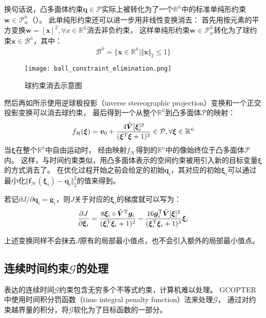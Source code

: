 换句话说，凸多面体约束$\bm{q} \in \mathcal{P}$实际上被转化为了一个$\mathbb{R}^{\hat{n}}$中的标准单纯形约束$\bm{w} \in \mathcal{P}_w^{\hat{n}}$（）。
此单纯形约束还可以进一步用非线性变换消去：
首先用按元素的平方变换$\bm{w}=[\bm{x}]^2,\forall x\in\mathbb{R}^{\hat{n}}$消去非负约束，
这样单纯形约束$\bm{w} \in \mathcal{P}_w^{\hat{n}}$转化为了球约束$\bm{x}\in\mathcal{B}^{\hat{n}}$，其中：
\begin{equation}
  \mathcal{B}^{\hat{n}} = \{ 
    \bm{x} \in \mathbb{R}^{\hat{n}} \mid \Vert \bm{x} \Vert_2 \leq 1
  \}
  \label{equ:ball_constraint}
\end{equation}
\begin{figure}[ht]
  \centering
  \texttt{[image: ball\_constraint\_elimination.png]}
  \caption{球约束消去示意图}
  \label{fig:elimination_of_ball_constraints}
\end{figure}
然后再如所示使用逆球极投影（inverse stereographic projection）变换和一个正交投影变换可以消去球约束，
最后得到一个从整个$\mathbb{R}^{\hat{n}}$到凸多面体$\mathcal{P}$的映射：
\begin{equation}
  f_{\mathcal{H}}(\bm{\xi}) = \bm{v}_0 + \frac{4\hat{\bm{V}}[\bm{\xi}]^2}{({\bm{\xi}}^{\text{T}}\bm{\xi} + 1)^2} \in \mathcal{P}, 
  \forall \bm{\xi} \in \mathbb{R}^{\hat{n}}
  \label{equ:polyhedron_constraint_elimination_map}
\end{equation}
当$\bm{\xi}$在整个$\mathbb{R}^{\hat{n}}$中自由运动时，
经由映射$f_{\mathcal{H}}$得到的$\mathbb{R}^n$中的像始终位于凸多面体$\mathcal{P}$内。
这样，与时间约束类似，用凸多面体表示的空间约束被用引入新的目标变量$\bm{\xi}$的方式消去了。
在优化过程开始之前会给定的初始$\bm{q}_i$，其对应的初始$\bm{\xi}_i$可以通过最小化$\Vert \bm{f}_{\mathcal{H}}(\bm{\xi}_i) - \bm{q}_i \Vert_2^2$的值来得到。


若记${\partial J}/{\partial \bm{q}_i}=\bm{g}_i$，则$J$关于对应的$\bm{\xi}_i$的梯度就可以写为：
\begin{equation}
  \frac{\partial{J}}{\partial{\bm{\xi}_i}} = 
  \frac{8\bm{\xi}_i \circ {\hat{\bm{V}}}^{\text{T}}\bm{g}_i}{(\bm{\xi}_i^{\text{T}}\bm{\xi}_i+1)^2} - 
  \frac{16\bm{g}_i^{\text{T}}\hat{\bm{V}}[\bm{\xi}]^2}{(\bm{\xi}_i^{\text{T}}\bm{\xi}_i+1)^3}\bm{\xi}_i
  \label{equ:grad_J_xii}
\end{equation}

上述变换同样不会抹去$J$原有的局部最小值点，也不会引入额外的局部最小值点。

\subsection{连续时间约束$\mathcal{G}$的处理}\label{subsec:processing_of_continuous_time_constraints}
表达的连续时间$\mathcal{G}$约束包含无穷多个不等式约束，计算机难以处理。
GCOPTER中使用时间积分罚函数（time integral penalty function）法来处理$\mathcal{G}$，
通过对约束越界量的积分，将$\mathcal{G}$软化为了目标函数的一部分。

